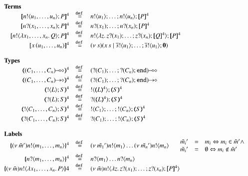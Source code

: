\begin{figure}[t]
	\[
		\begin{array}{rcl}
			\multicolumn{3}{l}{\textrm{\bf Terms}}
			\\
			\pmap{\bout{n}{u_1, \dots, u_n} P}{4} &\defeq& \bout{n}{u_1} \dots ; \bout{n}{u_n} \pmap{P}{4}
			\\
			\pmap{\binp{n}{x_1, \dots, x_n} P}{4} &\defeq& \binp{n}{x_1} \dots ; \binp{n}{x_n} \pmap{P}{4}
			\\
			\pmap{\bout{n}{\abs{x_1, \dots, x_n}{Q}} P}{4} &\defeq& \bout{n}{\abs{z}{\binp{z}{x_1} \dots; \binp{z}{x_n} \pmap{Q}{4}}} \pmap{P}{4}
			\\
			\pmap{\appl{x}{(u_1, \dots, u_n)}}{4} &\defeq& \newsp{s}{\appl{x}{s} \Par \bout{\dual{s}}{u_1} \dots; \bout{\dual{s}}{u_1} \inact}
			\\
			\\
			\multicolumn{3}{l}{\textrm{\bf Types}}
			\\
			\tmap{\lhot{(C_1, \dots, C_n)}}{4} &\defeq& \lhot{(\btinp{C_1} \dots; \btinp{C_n} \tinact)}
			\\
			\tmap{\shot{(C_1, \dots, C_n)}}{4} &\defeq& \shot{(\btinp{C_1} \dots; \btinp{C_n} \tinact)}
			\\
			\tmap{\btout{L} S}{4} &\defeq& \btout{\tmap{L}{4}} \tmap{S}{4}
			\\
			\tmap{\btinp{L} S}{4} &\defeq& \btinp{\tmap{L}{4}} \tmap{S}{4}
			\\
			\tmap{\btout{C_1, \dots, C_n} S}{4} &\defeq& \btout{C_1} \dots; \btout{C_n} \tmap{S}{4}
			\\
			\tmap{\btinp{C_1, \dots, C_n} S}{4} &\defeq& \btinp{C_1} \dots; \btout{C_n} \tmap{S}{4}
			\\
			\\
			\multicolumn{3}{l}{\textrm{\bf Labels}}
			\\
			\mapa{\news{\tilde{m}'} \bactout{n}{m_1, \dots, m_n}}^{4} &\defeq& \news{\tilde{m_1}'} \bactout{n}{m_1} \dots \news{\tilde{m_n}'}\bactout{n}{m_n}
			\quad \left.
			\begin{array}{rcl}
				\tilde{m_i}' &=& m_i \Leftrightarrow m_i \in \tilde{m}' \wedge\\
				\tilde{m_i}' &=& \es \Leftrightarrow m_i \notin \tilde{m}'
			\end{array}
			\right.
			\\
			\mapa{\bactinp{n}{m_1, \dots, m_n}}^{4} &\defeq& \bactinp{n}{m_1} \dots \bactinp{n}{m_n}
			\\
			\mapa{\news{\tilde{m}} \bactout{n}{\abs{x_1, \dots, x_n}{P}}}{4} &\defeq& \news{\tilde{m}} \bactout{n}{\abs{z}{\binp{z}{x_1} \dots; \binp{z}{x_n} \pmap{P}{4}}}

\end{array}\]
\end{figure}
